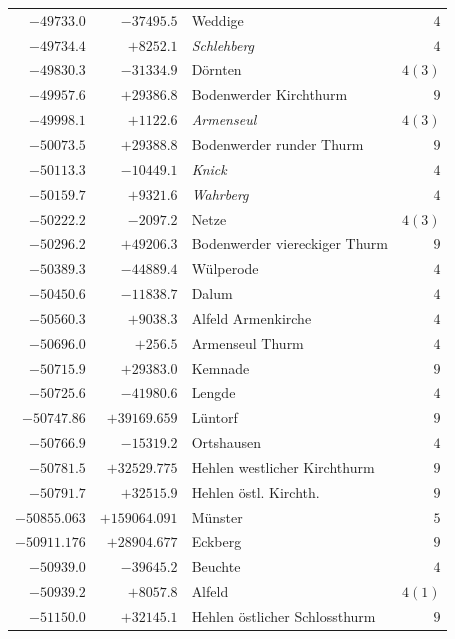 \begin{center}
\begin{tabular}{r|r|p{170pt}|r}
\(-49733.0\)&\(-37495.5\)&Weddige&\(4\)\\
\(-49734.4\)&\(+8252.1\)&\textit{Schlehberg}&\(4\)\\
\(-49830.3\)&\(-31334.9\)&Dörnten&\(4 (3)\)\\
\(-49957.6\)&\(+29386.8\)&Bodenwerder Kirchthurm&\(9\)\\
\(-49998.1\)&\(+1122.6\)&\textit{Armenseul}&\(4 (3)\)\\
\(-50073.5\)&\(+29388.8\)&Bodenwerder runder Thurm&\(9\)\\
\(-50113.3\)&\(-10449.1\)&\textit{Knick}&\(4\)\\
\(-50159.7\)&\(+9321.6\)&\textit{Wahrberg}&\(4\)\\
\(-50222.2\)&\(-2097.2\)&Netze&\(4 (3)\)\\
\(-50296.2\)&\(+49206.3\)&Bodenwerder viereckiger Thurm&\(9\)\\
\(-50389.3\)&\(-44889.4\)&Wülperode&\(4\)\\
\(-50450.6\)&\(-11838.7\)&Dalum&\(4\)\\
\(-50560.3\)&\(+9038.3\)&Alfeld Armenkirche&\(4\)\\
\(-50696.0\)&\(+256.5\)&Armenseul Thurm&\(4\)\\
\(-50715.9\)&\(+29383.0\)&Kemnade&\(9\)\\
\(-50725.6\)&\(-41980.6\)&Lengde&\(4\)\\
\(-50747.86\)&\(+39169.659\)&Lüntorf&\(9\)\\
\(-50766.9\)&\(-15319.2\)&Ortshausen&\(4\)\\
\(-50781.5\)&\(+32529.775\)&Hehlen westlicher Kirchthurm&\(9\)\\
\(-50791.7\)&\(+32515.9\)&Hehlen östl. Kirchth.&\(9\)\\
\(-50855.063\)&\(+159064.091\)&Münster&\(5\)\\
\(-50911.176\)&\(+28904.677\)&Eckberg&\(9\)\\
\(-50939.0\)&\(-39645.2\)&Beuchte&\(4\)\\
\(-50939.2\)&\(+8057.8\)&Alfeld&\(4 (1)\)\\
\(-51150.0\)&\(+32145.1\)&Hehlen östlicher Schlossthurm&\(9\)\\
\hline\end{tabular}\endgroup\end{center}
\clearpage
